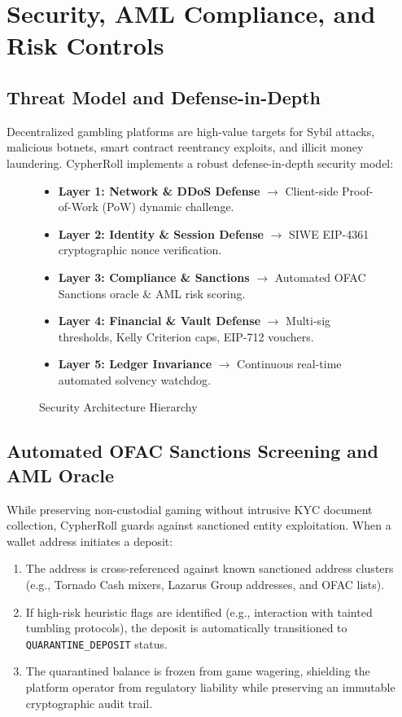 \section{Security, AML Compliance, and Risk Controls}

\subsection{Threat Model and Defense-in-Depth}
Decentralized gambling platforms are high-value targets for Sybil attacks, malicious botnets, smart contract reentrancy exploits, and illicit money laundering. CypherRoll implements a robust defense-in-depth security model:

\begin{figure}[h!]
\centering
\begin{tcolorbox}[colback=gray!5,colframe=blue!70!black,title=\textbf{Defense-in-Depth Pipeline}]
\begin{itemize}[leftmargin=1.5em]
    \item \textbf{Layer 1: Network \& DDoS Defense} $\rightarrow$ Client-side Proof-of-Work (PoW) dynamic challenge.
    \item \textbf{Layer 2: Identity \& Session Defense} $\rightarrow$ SIWE EIP-4361 cryptographic nonce verification.
    \item \textbf{Layer 3: Compliance \& Sanctions} $\rightarrow$ Automated OFAC Sanctions oracle \& AML risk scoring.
    \item \textbf{Layer 4: Financial \& Vault Defense} $\rightarrow$ Multi-sig thresholds, Kelly Criterion caps, EIP-712 vouchers.
    \item \textbf{Layer 5: Ledger Invariance} $\rightarrow$ Continuous real-time automated solvency watchdog.
\end{itemize}
\end{tcolorbox}
\caption{Security Architecture Hierarchy}
\end{figure}

\subsection{Automated OFAC Sanctions Screening and AML Oracle}
While preserving non-custodial gaming without intrusive KYC document collection, CypherRoll guards against sanctioned entity exploitation. When a wallet address initiates a deposit:
\begin{enumerate}[leftmargin=1.5em]
    \item The address is cross-referenced against known sanctioned address clusters (e.g., Tornado Cash mixers, Lazarus Group addresses, and OFAC lists).
    \item If high-risk heuristic flags are identified (e.g., interaction with tainted tumbling protocols), the deposit is automatically transitioned to \texttt{QUARANTINE\_DEPOSIT} status.
    \item The quarantined balance is frozen from game wagering, shielding the platform operator from regulatory liability while preserving an immutable cryptographic audit trail.
\end{enumerate}

